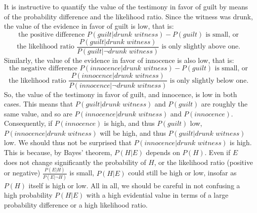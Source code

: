 \documentclass[10pt]{article}
\begin{document}
It is instructive to quantify the value of the testimony in favor of guilt by means of 
the probability difference and the likelihood ratio. Since the witness was drunk, the value of the evidence in favor of guilt is 
low, that is:
%
\[\text{the positive difference $P(\textit{guilt} | \textit{drunk witness}) - P(\textit{guilt})$ is small, or}\]
%
%
\[\text{the likelihood ratio $\frac{P(\textit{guilt} | \textit{drunk witness})}{P(\textit{guilt} | \neg\textit{drunk witness})}$ is only slightly above one}.\] 
%
Similarly, the value of the evidence in favor of innocence is also low, that is:
%
\[\text{the negative difference $P(\textit{innocence} | \textit{drunk witness}) - P(\textit{guilt})$ is small, or}\]
%
%
\[\text{the likelihood ratio $\frac{P(\textit{innocence} | \textit{drunk witness})}{P(\textit{innocence} | \neg\textit{drunk witness})}$ is only slightly below one}.\] 
%
So, the value of the testimony in favor of guilt, and innocence, is low 
in both cases. This means that $P(\textit{guilt} | \textit{drunk witness})$
and $P(\textit{guilt})$ are roughly the same value, and so are $P(\textit{innocence} | \textit{drunk witness})$ 
and $P(\textit{innocence})$. Consequently, if $P(\textit{innocence})$ is high, 
and thus $P(\textit{guilt})$ low, $P(\textit{innocence} | \textit{drunk witness})$ will 
be high, and thus $P(\textit{guilt} | \textit{drunk witness})$ low. %
We should thus not be surprised that $P(\textit{innocence} | \textit{drunk witness})$ is high. 
This is because, by Bayes' theorem, $P(H|E)$ depends on $P(H)$.  
Even if $E$ does not change significantly the probability of $H$, or the likelihood ratio (positive or negative) 
$\frac{P(E|H)}{P(E| \neg H)}$ is small, $P(H|E)$ could still be high or low, insofar as $P(H)$ itself is high or low. 
All in all, we should be careful in not confusing a high probability $P(H|E)$ with a high 
evidential value in terms of a large probability difference or a high likelihood ratio.
\end{document}
